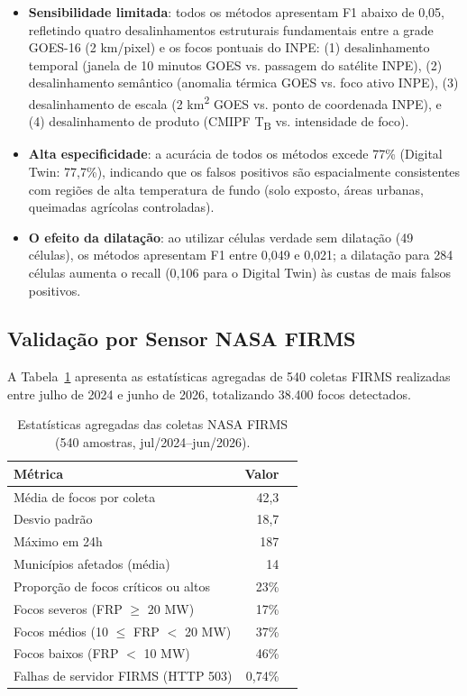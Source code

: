 \begin{itemize}
    \item \textbf{Sensibilidade limitada}: todos os métodos apresentam F1 abaixo de 0,05, refletindo quatro desalinhamentos estruturais fundamentais entre a grade GOES-16 (2 km/pixel) e os focos pontuais do INPE: (1) desalinhamento temporal (janela de 10 minutos GOES vs. passagem do satélite INPE), (2) desalinhamento semântico (anomalia térmica GOES vs. foco ativo INPE), (3) desalinhamento de escala (2 km\textsuperscript{2} GOES vs. ponto de coordenada INPE), e (4) desalinhamento de produto (CMIPF T\textsubscript{B} vs. intensidade de foco).
    \item \textbf{Alta especificidade}: a acurácia de todos os métodos excede 77\% (Digital Twin: 77,7\%), indicando que os falsos positivos são espacialmente consistentes com regiões de alta temperatura de fundo (solo exposto, áreas urbanas, queimadas agrícolas controladas).
    \item \textbf{O efeito da dilatação}: ao utilizar células verdade sem dilatação (49 células), os métodos apresentam F1 entre 0,049 e 0,021; a dilatação para 284 células aumenta o recall (0,106 para o Digital Twin) às custas de mais falsos positivos.
\end{itemize}

\subsection{Validação por Sensor NASA FIRMS}
\label{sec:firms-validation}

A Tabela~\ref{tab:firms-stats} apresenta as estatísticas agregadas de 540 coletas FIRMS realizadas entre julho de 2024 e junho de 2026, totalizando 38.400 focos detectados.

\begin{table}[htbp]
\centering
\caption{Estatísticas agregadas das coletas NASA FIRMS (540 amostras, jul/2024--jun/2026).}
\label{tab:firms-stats}
\small
\begin{tabular}{@{}lrr@{}}
\toprule
\textbf{Métrica} & \textbf{Valor} \\ 
\midrule
Média de focos por coleta & 42,3 \\
Desvio padrão & 18,7 \\
Máximo em 24h & 187 \\
Municípios afetados (média) & 14 \\
Proporção de focos críticos ou altos & 23\% \\
Focos severos (FRP $\ge$ 20 MW) & 17\% \\
Focos médios (10 $\le$ FRP $<$ 20 MW) & 37\% \\
Focos baixos (FRP $<$ 10 MW) & 46\% \\
Falhas de servidor FIRMS (HTTP 503) & 0,74\% \\
\bottomrule
\end{tabular}
\end{table}

